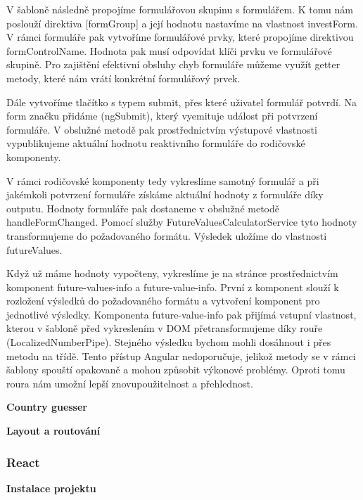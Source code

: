 V šabloně následně propojíme formulářovou skupinu s formulářem. K tomu nám poslouží direktiva [formGroup] a její hodnotu nastavíme na vlastnost investForm. 
V rámci formuláře pak vytvoříme formulářové prvky, které propojíme direktivou formControlName. Hodnota pak musí odpovídat klíči prvku ve formulářové skupině. 
Pro zajištění efektivní obsluhy chyb formuláře můžeme využít getter metody, které nám vrátí konkrétní formulářový prvek.

Dále vytvoříme tlačítko s typem submit, přes které uživatel formulář potvrdí. Na form značku přidáme (ngSubmit), který vyemituje událost při potvrzení formuláře. 
V obslužné metodě pak prostřednictvím výstupové vlastnosti vypublikujeme aktuální hodnotu reaktivního formuláře do rodičovské komponenty.

V rámci rodičovské komponenty tedy vykreslíme samotný formulář a při jakémkoli potvrzení formuláře získáme aktuální hodnoty z formuláře díky outputu. 
Hodnoty formuláře pak dostaneme v obslužné metodě handleFormChanged. Pomocí služby FutureValuesCalculatorService tyto hodnoty transformujeme do požadovaného formátu. 
Výsledek uložíme do vlastnosti futureValues. 

Když už máme hodnoty vypočteny, vykreslíme je na stránce prostřednictvím komponent future-values-info a future-value-info. 
První z komponent slouží k rozložení výsledků do požadovaného formátu a vytvoření komponent pro jednotlivé výsledky. 
Komponenta future-value-info pak přijímá vstupní vlastnost, kterou v šabloně před vykreslením v DOM přetransformujeme díky rouře (LocalizedNumberPipe). 
Stejného výsledku bychom mohli dosáhnout i přes metodu na třídě. Tento přístup Angular nedoporučuje, jelikož metody se v rámci šablony spouští opakovaně a mohou způsobit výkonové problémy. 
Oproti tomu roura nám umožní lepší znovupoužitelnost a přehlednost.

\begin{flushleft}
  \textbf{Country guesser}
\end{flushleft}

\begin{flushleft}
  \textbf{Layout a routování}
\end{flushleft}

\subsubsection{React}

\begin{flushleft}
  \textbf{Instalace projektu}
\end{flushleft}

